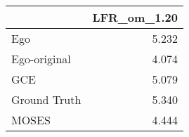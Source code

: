 \begin{tabular}{lr}
\toprule
{} & LFR_om_1.20 \\
\midrule
Ego          &       5.232 \\
Ego-original &       4.074 \\
GCE          &       5.079 \\
Ground Truth &       5.340 \\
MOSES        &       4.444 \\
\bottomrule
\end{tabular}
